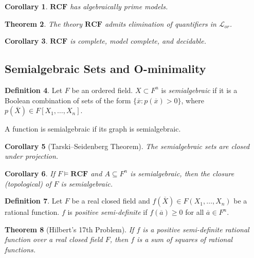 \documentclass{amsart}
\newtheorem{theorem}{Theorem}[subsection]
\newtheorem{corollary}[theorem]{Corollary}
\theoremstyle{definition}
\newtheorem{definition}[theorem]{Definition}
\numberwithin{equation}{section}
\begin{document}

\begin{corollary}
  $\mathbf{RCF}$ has algebraically prime models.
\end{corollary}

\begin{theorem}
  The theory $\mathbf{RCF}$ admits elimination of quantifiers in $\mathcal{L}_{or}$.
\end{theorem}

\begin{corollary}
  $\mathbf{RCF}$ is complete, model complete, and decidable.
\end{corollary}

\subsection{Semialgebraic Sets and O-minimality}
\begin{definition}
  Let $F$ be an ordered field.
  $X \subset F^n$ is \emph{semialgebraic} if it is a Boolean combination of sets of the form $\{\overline{x}:p(\overline{x})>0\}$,
  where $p(\overline{X}) \in F[X_1,\dots,X_n]$.

  A function is semialgebraic if its graph is semialgebraic.
\end{definition}

\begin{corollary}[Tarski--Seidenberg Theorem]
  The semialgebraic sets are closed under projection.
\end{corollary}

\begin{corollary}
  If $F \models \mathbf{RCF}$ and $A \subseteq F^n$ is semialgebraic,
  then the closure (topological) of $F$ is semialgebraic.
\end{corollary}

\begin{definition}
  Let $F$ be a real closed field and
  $f(\overline{X}) \in F(X_1,\dots,X_n)$ be a rational function.
  $f$ is \emph{positive semi-definite} if $f(\overline{a}) \ge 0$ for all $\overline{a} \in F^n$.
\end{definition}

\begin{theorem}[Hilbert's 17th Problem]
  If $f$ is a positive semi-definite rational function over a real closed field $F$,
  then $f$ is a sum of squares of rational functions.
\end{theorem}
\end{document}
